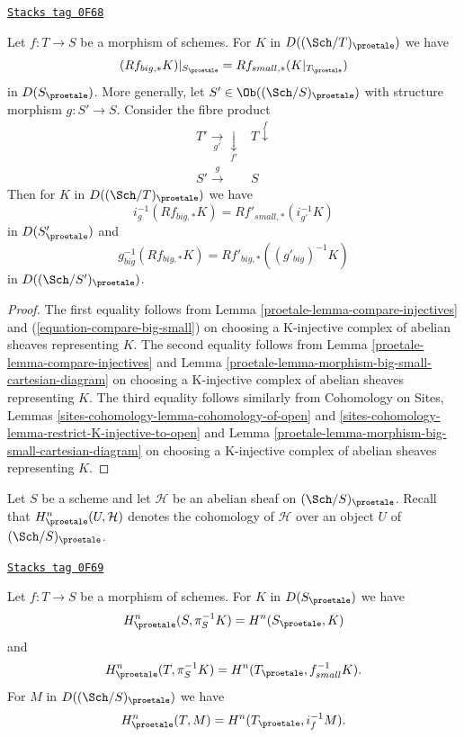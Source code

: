 \begin{lemma}
\label{proetale-lemma-compare-higher-direct-image}
\href{https://stacks.math.columbia.edu/tag/0F68}{\texttt{Stacks tag 0F68}}

Let $f : T \to S$ be a morphism of schemes.
For $K$ in $D((\Sch/T)_\proetale)$ we have
$$
(Rf_{big, *}K)|_{S_\proetale} = Rf_{small, *}(K|_{T_\proetale})
$$
in $D(S_\proetale)$. More generally, let $S' \in \Ob((\Sch/S)_\proetale)$
with structure morphism $g : S' \to S$. Consider the fibre product
$$
\begin{array}{cc}T' \underset{g'}{\longrightarrow}\underset{f'}{\downarrow} & T \overset{f}{\downarrow} \\ S' \overset{g}{\longrightarrow} & S\end{array}
$$
Then for $K$ in $D((\Sch/T)_\proetale)$ we have
$$
i_g^{-1}(Rf_{big, *}K) = Rf'_{small, *}(i_{g'}^{-1}K)
$$
in $D(S'_\proetale)$ and
$$
g_{big}^{-1}(Rf_{big, *}K) = Rf'_{big, *}((g'_{big})^{-1}K)
$$
in $D((\Sch/S')_\proetale)$.
\end{lemma}

\begin{proof}

The first equality follows from Lemma \ref{proetale-lemma-compare-injectives}
and (\ref{equation-compare-big-small})
on choosing a K-injective complex of abelian sheaves representing $K$.
The second equality follows from Lemma \ref{proetale-lemma-compare-injectives}
and Lemma
\ref{proetale-lemma-morphism-big-small-cartesian-diagram}
on choosing a K-injective complex of abelian sheaves representing $K$.
The third equality follows similarly from
Cohomology on Sites, Lemmas \ref{sites-cohomology-lemma-cohomology-of-open} and
\ref{sites-cohomology-lemma-restrict-K-injective-to-open}
and Lemma \ref{proetale-lemma-morphism-big-small-cartesian-diagram}
on choosing a K-injective complex of abelian sheaves representing $K$.
\end{proof}

Let $S$ be a scheme and let $\mathcal{H}$ be an abelian sheaf on
$(\Sch/S)_\proetale$. Recall that $H^n_\proetale(U, \mathcal{H})$ denotes
the cohomology of $\mathcal{H}$ over an object $U$ of $(\Sch/S)_\proetale$.

\begin{lemma}
\label{proetale-lemma-compare-cohomology-big-small}
\href{https://stacks.math.columbia.edu/tag/0F69}{\texttt{Stacks tag 0F69}}

Let $f : T \to S$ be a morphism of schemes. For $K$ in $D(S_\proetale)$
we have
$$
H^n_\proetale(S, \pi_S^{-1}K) = H^n(S_\proetale, K)
$$
and
$$
H^n_\proetale(T, \pi_S^{-1}K) = H^n(T_\proetale, f_{small}^{-1}K).
$$
For $M$ in $D((\Sch/S)_\proetale)$ we have
$$
H^n_\proetale(T, M) = H^n(T_\proetale, i_f^{-1}M).
$$
\end{lemma}

